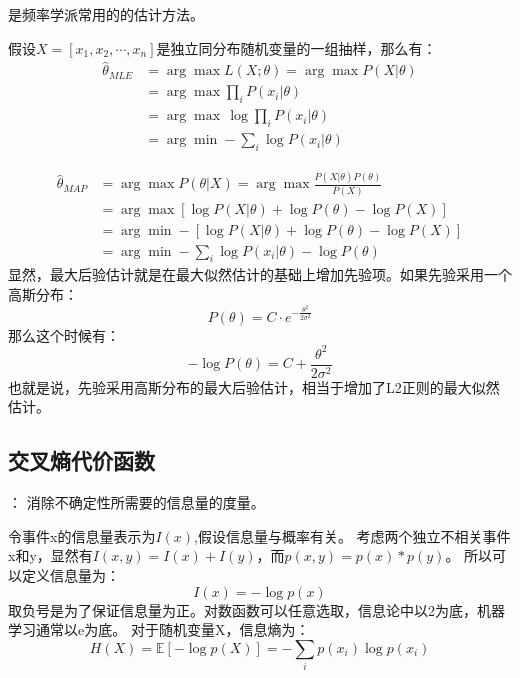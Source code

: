 {} 是频率学派常用的的估计方法。

假设$X=[x_1, x_2, \cdots, x_n]$是独立同分布随机变量的一组抽样，那么有：
\begin{align*}
    \hat{\theta}_{MLE} &= \arg \max L(X;\theta) = \arg \max P(X|\theta) \\
    &= \arg \max \prod_i P(x_i|\theta) \\
    &= \arg \max \, \log \prod_i P(x_i|\theta) \\
    &= \arg \min -\sum_i \log P(x_i|\theta)    
\end{align*}

{}
\begin{align*}
    \hat{\theta}_{MAP} &= \arg \max P(\theta|X) = \arg\max \frac{P(X|\theta)P(\theta)}{P(X)} \\
    &= \arg \max \left[\log P(X|\theta) + \log P(\theta) - \log P(X) \right] \\
    &= \arg \min -\left[\log P(X|\theta) + \log P(\theta) - \log P(X) \right] \\
    &= \arg \min -\sum_i \log P(x_i|\theta) -\log P(\theta)
\end{align*}
显然，最大后验估计就是在最大似然估计的基础上增加先验项。如果先验采用一个高斯分布：
\begin{equation*}
    P(\theta) = C \cdot e^{-\frac{\theta^2}{2\sigma^2}}
\end{equation*}
那么这个时候有：
\begin{equation*}
    - \log P(\theta) = C + \frac{\theta^2}{2\sigma^2}
\end{equation*}
也就是说，{\color{red}先验采用高斯分布的最大后验估计，相当于增加了L2正则的最大似然估计。}


\subsection{交叉熵代价函数}
{}： 消除不确定性所需要的信息量的度量。

令事件x的信息量表示为$I(x)$,假设信息量与概率有关。
考虑两个独立不相关事件x和y，显然有$I(x,y) = I(x)+I(y)$，而$p(x,y)=p(x)*p(y)$。
所以可以定义信息量为：
\begin{equation*}
    I(x) = -\log p(x)
\end{equation*}
取负号是为了保证信息量为正。对数函数可以任意选取，信息论中以2为底，机器学习通常以e为底。
对于随机变量X，信息熵为：
\begin{equation*}
    H(X) = \mathbb{E}[-\log p(X)] = - \sum_i p(x_i) \log p(x_i)
\end{equation*}


